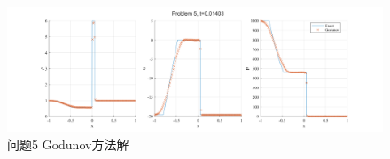 \documentclass[UTF8,zihao=5]{ctexart} %
\begin{document}
\begin{figure}[H]
    \centering
    \includegraphics[width=18cm]{p5_gn.png}  %
    \caption{问题5 Godunov方法解}
    \label{fig:5c}
\end{figure}

























\end{document}
